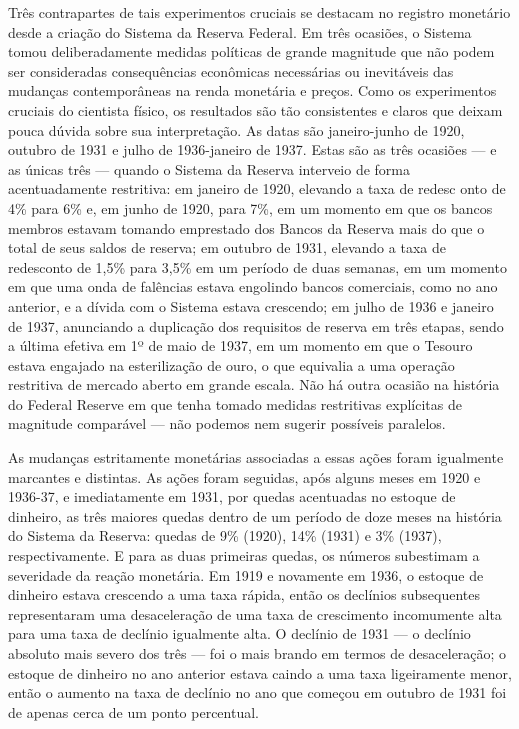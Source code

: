 \documentclass[a4paper,12pt]{article}[abntex2]
\begin{document}
Três contrapartes de tais experimentos cruciais se destacam no registro monetário desde a criação do Sistema da Reserva Federal. Em três ocasiões, o Sistema tomou deliberadamente medidas políticas de grande magnitude que não podem ser consideradas consequências econômicas necessárias ou inevitáveis das mudanças contemporâneas na renda monetária e preços. Como os experimentos cruciais do cientista físico, os resultados são tão consistentes e claros que deixam pouca dúvida sobre sua interpretação. As datas são janeiro-junho de 1920, outubro de 1931 e julho de 1936-janeiro de 1937. Estas são as três ocasiões — e as únicas três — quando o Sistema da Reserva interveio de forma acentuadamente restritiva: em janeiro de 1920, elevando a taxa de redesc
onto de 4\% para 6\% e, em junho de 1920, para 7\%, em um momento em que os bancos membros estavam tomando emprestado dos Bancos da Reserva mais do que o total de seus saldos de reserva; em outubro de 1931, elevando a taxa de redesconto de 1,5\% para 3,5\% em um período de duas semanas, em um momento em que uma onda de falências estava engolindo bancos comerciais, como no ano anterior, e a dívida com o Sistema estava crescendo; em julho de 1936 e janeiro de 1937, anunciando a duplicação dos requisitos de reserva em três etapas, sendo a última efetiva em 1º de maio de 1937, em um momento em que o Tesouro estava engajado na esterilização de ouro, o que equivalia a uma operação restritiva de mercado aberto em grande escala. Não há outra ocasião na história do Federal Reserve em que tenha tomado medidas restritivas explícitas de magnitude comparável — não podemos nem sugerir possíveis paralelos.

As mudanças estritamente monetárias associadas a essas ações foram igualmente marcantes e distintas. As ações foram seguidas, após alguns meses em 1920 e 1936-37, e imediatamente em 1931, por quedas acentuadas no estoque de dinheiro, as três maiores quedas dentro de um período de doze meses na história do Sistema da Reserva: quedas de 9\% (1920), 14\% (1931) e 3\% (1937), respectivamente. E para as duas primeiras quedas, os números subestimam a severidade da reação monetária. Em 1919 e novamente em 1936, o estoque de dinheiro estava crescendo a uma taxa rápida, então os declínios subsequentes representaram uma desaceleração de uma taxa de crescimento incomumente alta para uma taxa de declínio igualmente alta. O declínio de 1931 — o declínio absoluto mais severo dos três — foi o mais brando em termos de desaceleração; o estoque de dinheiro no ano anterior estava caindo a uma taxa ligeiramente menor, então o aumento na taxa de declínio no ano que começou em outubro de 1931 foi de apenas cerca de um ponto percentual.
\end{document}
